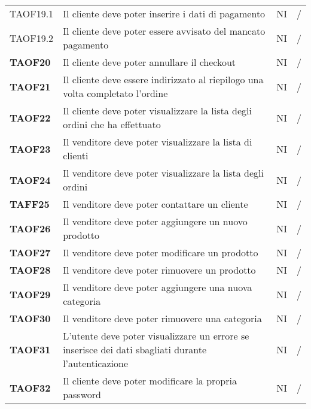 \begin{center}
\begin{longtable}[!h]{p{60px} p{240px} p{35px} p{35px}}
        TAOF19.1        & Il cliente deve poter inserire i dati di pagamento                                                  & NI             & /              \\
        TAOF19.2        & Il cliente deve poter essere avvisato del mancato pagamento                                         & NI             & /              \\
        \textbf{TAOF20} & Il cliente deve poter annullare il checkout                                                         & NI             & /              \\
        \textbf{TAOF21} & Il cliente deve essere indirizzato al riepilogo una volta completato l'ordine                       & NI             & /              \\
        \textbf{TAOF22} & Il cliente deve poter visualizzare la lista degli ordini che ha effettuato                          & NI             & /              \\
        \textbf{TAOF23} & Il venditore deve poter visualizzare la lista di clienti                                            & NI             & /              \\
        \textbf{TAOF24} & Il venditore deve poter visualizzare la lista degli ordini                                          & NI             & /              \\
        \textbf{TAFF25} & Il venditore deve poter contattare un cliente                                                       & NI             & /              \\
        \textbf{TAOF26} & Il venditore deve poter aggiungere un nuovo prodotto                                                & NI             & /              \\
        \textbf{TAOF27} & Il venditore deve poter modificare un prodotto                                                      & NI             & /              \\
        \textbf{TAOF28} & Il venditore deve poter rimuovere un prodotto                                                       & NI             & /              \\
        \textbf{TAOF29} & Il venditore deve poter aggiungere una nuova categoria                                              & NI             & /              \\
        \textbf{TAOF30} & Il venditore deve poter rimuovere una categoria                                                     & NI             & /              \\
        \textbf{TAOF31} & L'utente deve poter visualizzare un errore se inserisce dei dati sbagliati durante l'autenticazione & NI             & /              \\
        \textbf{TAOF32} & Il cliente deve poter modificare la propria password                                                & NI             & /              \\
    \end{longtable}
\end{center}